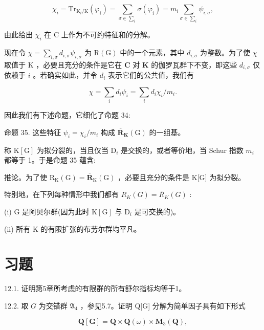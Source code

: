 \documentclass[10pt]{article}
\begin{document}
\[
{\chi }_{i} = {\mathrm{{Tr}}}_{{\mathrm{K}}_{i}/\mathrm{K}}\left( {\varphi }_{i}\right)  = \mathop{\sum }\limits_{{\sigma  \in  {\sum }_{i}}}\sigma \left( {\varphi }_{i}\right)  = {m}_{i}\mathop{\sum }\limits_{{\sigma  \in  {\sum }_{i}}}{\psi }_{i,\sigma },
\]

由此给出 \({\chi }_{i}\) 在 C 上作为不可约特征和的分解。

现在令 \(\chi  = \mathop{\sum }\limits_{{i,\sigma }}{d}_{i,\sigma }{\psi }_{i,\sigma }\) 为 \(\mathrm{R}\left( \mathrm{G}\right)\) 中的一个元素，其中 \({d}_{i,\sigma }\) 为整数。为了使 \(\chi\) 取值于 \(\mathrm{K}\) ，必要且充分的条件是它在 \(\mathbf{C}\) 对 \(\mathbf{K}\) 的伽罗瓦群下不变，即这些 \({d}_{i,\sigma }\) 仅依赖于 \(i\) 。若确实如此，并令 \({d}_{i}\) 表示它们的公共值，我们有

\[
\chi  = \mathop{\sum }\limits_{i}{d}_{i}{\psi }_{i} = \mathop{\sum }\limits_{i}{d}_{i}{\chi }_{i}/{m}_{i}.
\]

因此我们有下述命题，它细化了命题 34:

命题 35. 这些特征 \({\psi }_{i} = {\chi }_{i}/{m}_{i}\) 构成 \({\overline{\mathbf{R}}}_{\mathbf{K}}\left( \mathrm{G}\right)\) 的一组基。

称 \(\mathrm{K}\left\lbrack  \mathrm{G}\right\rbrack\) 为拟分裂的，当且仅当 \({\mathrm{D}}_{i}\) 是交换的，或者等价地，当 Schur 指数 \({m}_{i}\) 都等于 1。于是命题 35 蕴含:

推论。为了使 \({\mathrm{R}}_{\mathrm{K}}\left( \mathrm{G}\right)  = {\overline{\mathbf{R}}}_{\mathrm{K}}\left( \mathrm{G}\right)\) ，必要且充分的条件是 K[G] 为拟分裂。

特别地，在下列每种情形中我们都有 \({R}_{K}\left( G\right)  = {\bar{R}}_{K}\left( G\right)\) :

(i) \(\mathrm{G}\) 是阿贝尔群(因为此时 \(\mathrm{K}\left\lbrack  \mathrm{G}\right\rbrack\) 与 \({\mathrm{D}}_{i}\) 是可交换的)。

(ii) 所有 \(\mathrm{K}\) 的有限扩张的布劳尔群均平凡。

\section*{习题}

12.1. 证明第5章所考虑的有限群的所有舒尔指标均等于1。

12.2. 取 \(G\) 为交错群 \({\mathfrak{A}}_{4}\) ，参见5.7。证明 Q[G] 分解为简单因子具有如下形式

\[
\mathbf{Q}\left\lbrack  \mathbf{G}\right\rbrack   = \mathbf{Q} \times  \mathbf{Q}\left( \omega \right)  \times  {\mathbf{M}}_{3}\left( \mathbf{Q}\right) ,
\]
\end{document}
